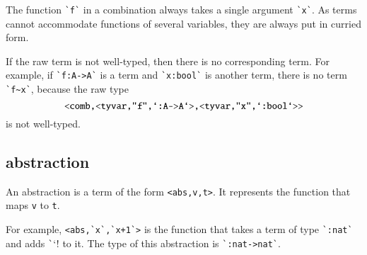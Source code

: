 \documentclass[cup9a]{cupbook}
\begin{document}
The function \verb!`f`! in a combination always takes a single argument \verb!`x`!.  As terms cannot accommodate functions of several variables, they are always put in curried form.

If the raw term is not well-typed, then there is no corresponding term.  For example, if \verb!`f:A->A`! is a term and
\verb!`x:bool`! is another term, there is no term \verb!`f~x`!, because the raw type
$$
\verb!<comb,<tyvar,"f",`:A->A`>,<tyvar,"x",`:bool`>>!
$$
is not well-typed.

\subsection{abstraction}

An abstraction is a term of the form \verb!<abs,v,t>!.  It
represents the function that maps \verb!v! to \verb!t!.

For example, \verb!<abs,`x`,`x+1`>! is the function that
takes a term of type \verb!`:nat`! and adds \verb!`!`! to
it.  The type of this abstraction is \verb!`:nat->nat`!.
\end{document}
